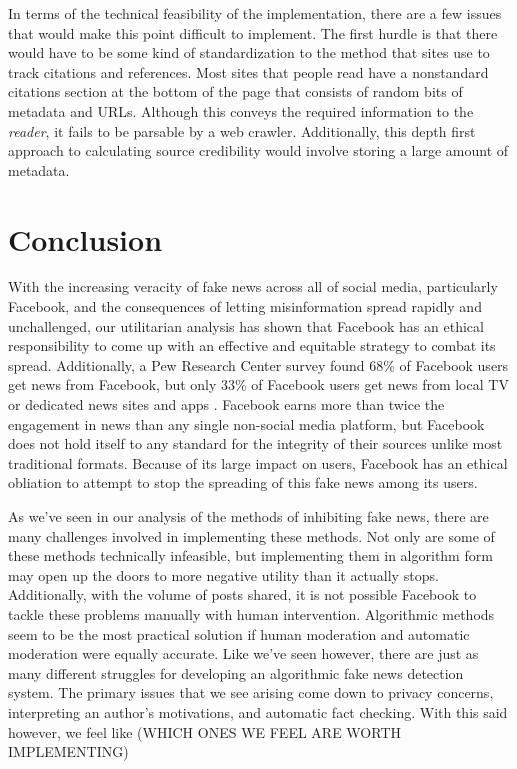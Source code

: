 \documentclass[12pt]{article}
\begin{document}
In terms of the technical feasibility of the implementation, there are a few issues that would make this point difficult to implement. The first hurdle is that there would have to be some kind of standardization to the method that sites use to track citations and references. Most sites that people read have a nonstandard citations section at the bottom of the page that consists of random bits of metadata and URLs. Although this conveys the required information to the \textit{reader}, it fails to be parsable by a web crawler. Additionally, this depth first approach to calculating source credibility would involve storing a large amount of metadata.

\section{Conclusion}

With the increasing veracity of fake news across all of social media, particularly Facebook, and the consequences of letting misinformation spread rapidly and unchallenged, our utilitarian analysis has shown that Facebook has an ethical responsibility to come up with an effective and equitable strategy to combat its spread. Additionally, a Pew Research Center survey found 68\% of Facebook users get news from Facebook, but only 33\% of Facebook users get news from local TV or dedicated news sites and apps \citep{pew_news}. Facebook earns more than twice the engagement in news than any single non-social media platform, but Facebook does not hold itself to any standard for the integrity of their sources unlike most traditional formats. Because of its large impact on users, Facebook has an ethical obliation to attempt to stop the spreading of this fake news among its users.

As we've seen in our analysis of the methods of inhibiting fake news, there are many challenges involved in implementing these methods. Not only are some of these methods technically infeasible, but implementing them in algorithm form may open up the doors to more negative utility than it actually stops. Additionally, with the volume of posts shared, it is not possible Facebook to tackle these problems manually with human intervention. Algorithmic methods seem to be the most practical solution if human moderation and automatic moderation were equally accurate. Like we've seen however, there are just as many different struggles for developing an algorithmic fake news detection system. The primary issues that we see arising come down to privacy concerns, interpreting an author's motivations, and automatic fact checking. With this said however, we feel like (WHICH ONES WE FEEL ARE WORTH IMPLEMENTING)
\end{document}

